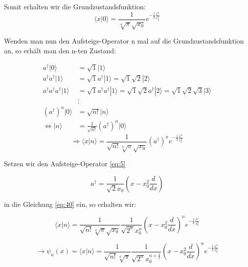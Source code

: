 Somit erhalten wir die Grundzustandsfunktion:
\begin{equation}
  \label{eq:38}
   \langle x |0\rangle = \frac{1}{\sqrt[4]{\pi}\sqrt{x_0}} e^{-\frac{1}{2}\frac{x^2}{x_0^2}}
\end{equation}

Wenden man nun den Aufsteige-Operator n mal auf die Grundzustandsfunktion an, so erhält man den n-ten Zustand:


\begin{align}
  \label{eq:39}
  a^\dagger|0\rangle&=\sqrt 1 |1\rangle \\
 a^\dagger a^\dagger|1\rangle &= \sqrt 1 a^\dagger|1\rangle = \sqrt 1 \sqrt 2 |2\rangle\\
 a^\dagger a^\dagger a^\dagger|1\rangle &= \sqrt 1 a^\dagger a^\dagger|1\rangle = \sqrt 1 \sqrt 2  a^\dagger |2\rangle
                             =\sqrt 1 \sqrt 2  \sqrt 3 |3\rangle\\
 &\vdots\\
 (a^\dagger)^n|0\rangle  &= \sqrt{n!}|n\rangle\\
 \Leftrightarrow |n\rangle &=\frac{1}{\sqrt{n!}}(a^\dagger)^n|0\rangle
\end{align}
\begin{equation}
  \label{eq:40}
   \Rightarrow \langle x |n\rangle = \frac{1}{\sqrt{n!}\sqrt[4]{\pi}\sqrt{x_0}} (a^\dagger)^n e^{-\frac{1}{2}\frac{x^2}{x_0^2}}
\end{equation}

Setzen wir den Aufsteige-Operator \eqref{eq:5}

\begin{equation}
  \label{eq:41}
  a^\dagger = \frac{1}{\sqrt{2}x_0}\left( x - x_0^2 \frac{d}{dx}\right)
\end{equation}

 in die Gleichung \eqref{eq:40} ein, so erhalten wir:

 \begin{equation}
   \label{eq:42}
    \langle x |n\rangle = \frac{1}{\sqrt{n!}\sqrt[4]{\pi}\sqrt{x_0}} \frac{1}{\sqrt{2^n}x_0^n}\left( x - x_0^2 \frac{d}{dx}\right)^n  e^{-\frac{1}{2}\frac{x^2}{x_0^2}}
 \end{equation}

 \begin{equation}
   \label{eq:43}
  \rightarrow  \boxed{\psi_n(x) =  \langle x |n\rangle = \frac{1}{\sqrt{n!}\sqrt[4]{\pi}} \frac{1}{\sqrt{2^n}x_0^{n+\frac{1}{2}}}\left( x - x_0^2 \frac{d}{dx}\right)^n  e^{-\frac{1}{2}\frac{x^2}{x_0^2}}   }
 \end{equation}



